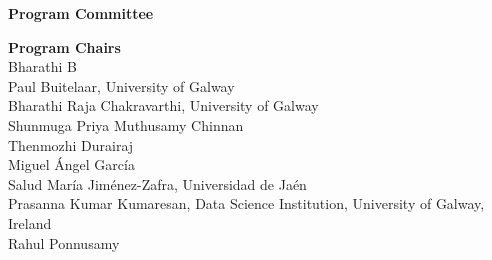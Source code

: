 \documentclass[11pt,oneside]{book}
\begin{document}

{}
\begin{center}
\Large \textbf{Program Committee}
\end{center}
\vspace*{1cm}
\begin{description}
  \item{\bf Program Chairs}\vspace{2mm}\\
            Bharathi B\\
          Paul Buitelaar, University of Galway\\
          Bharathi Raja Chakravarthi, University of Galway\\
          Shunmuga Priya Muthusamy Chinnan\\
          Thenmozhi Durairaj\\
          Miguel Ángel García\\
          Salud María Jiménez-Zafra, Universidad de Jaén\\
          Prasanna Kumar Kumaresan, Data Science Institution, University of Galway, Ireland\\
          Rahul Ponnusamy\\
      

\end{description}
\end{document}
